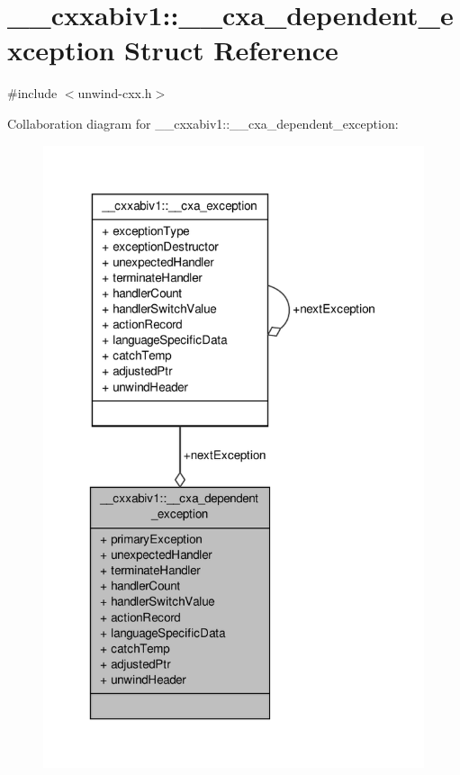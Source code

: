 \hypertarget{struct____cxxabiv1_1_1____cxa__dependent__exception}{\section{\-\_\-\-\_\-cxxabiv1\-:\-:\-\_\-\-\_\-cxa\-\_\-dependent\-\_\-exception Struct Reference}
\label{struct____cxxabiv1_1_1____cxa__dependent__exception}
}


{\ttfamily \#include $<$unwind-\/cxx.\-h$>$}



Collaboration diagram for \-\_\-\-\_\-cxxabiv1\-:\-:\-\_\-\-\_\-cxa\-\_\-dependent\-\_\-exception\-:\nopagebreak
\begin{figure}[H]
\begin{center}
\leavevmode
\includegraphics[width=317pt]{struct____cxxabiv1_1_1____cxa__dependent__exception__coll__graph}
\end{center}
\end{figure}
